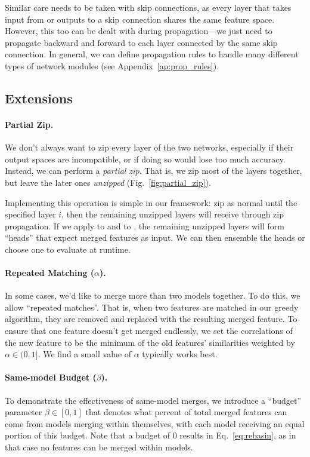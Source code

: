 Similar care needs to be taken with skip connections, as every layer that takes input from or outputs to a skip connection shares the same feature space. However, this too can be dealt with during propagation---we just need to propagate  backward and  forward to each layer connected by the same skip connection. 
In general, we can define propagation rules to handle many different types of network modules (see Appendix~\ref{ap:prop_rules}).


\subsection{Extensions}\label{sec:extensions}

\paragraph{Partial Zip.} \label{sec:partial_zip}
We don't always want to zip every layer of the two networks, especially if their output spaces are incompatible, or if doing so would lose too much accuracy. 
Instead, we can perform a \textit{partial zip}. That is, we zip most of the layers together, but leave
the later ones \textit{unzipped} (Fig.~\ref{fig:partial_zip}).

Implementing this operation is simple in our framework: zip as normal until the specified layer $i$, then the remaining unzipped layers will receive  through zip propagation. If we apply  to  and  to , the remaining unzipped layers will form ``heads'' that expect merged features as input. We can then ensemble the heads or choose one to evaluate at runtime.

\paragraph{Repeated Matching ($\alpha$).} In some cases, we'd like to merge more than two models together. To do this, we allow ``repeated matches''. That is, when two features are matched in our greedy algorithm, they are removed and replaced with the resulting merged feature. To ensure that one feature doesn't get merged endlessly, we set the correlations of the new feature to be the minimum of the old features' similarities weighted by $\alpha \in (0,1]$. We find a small value of $\alpha$ typically works best.

\paragraph{Same-model Budget ($\beta$).} To demonstrate the effectiveness of same-model merges, we introduce a ``budget'' parameter $\beta \in [0, 1]$ that denotes what percent of total merged features can come from models merging within themselves, with each model receiving an equal portion of this budget. Note that a budget of 0 results in Eq.~\ref{eq:rebasin}, as in that case no features can be merged within models.
